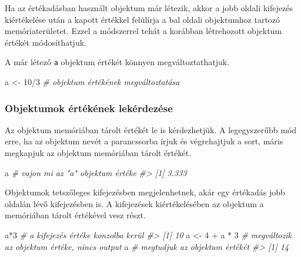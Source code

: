\documentclass[
]{book}
\newenvironment{Shaded}{\begin{snugshade}}{\end{snugshade}}
\newcommand{\CommentTok}[1]{\textcolor[rgb]{0.56,0.35,0.01}{\textit{#1}}}
\newcommand{\DecValTok}[1]{\textcolor[rgb]{0.00,0.00,0.81}{#1}}
\newcommand{\NormalTok}[1]{#1}
\newcommand{\OtherTok}[1]{\textcolor[rgb]{0.56,0.35,0.01}{#1}}
\newcommand{\SpecialCharTok}[1]{\textcolor[rgb]{0.00,0.00,0.00}{#1}}
\begin{document}
Ha az értékadásban használt objektum már létezik, akkor a jobb oldali kifejezés kiértékelése után a kapott értékkel felülírja a bal oldali objektumhoz tartozó memóriaterületet. Ezzel a módszerrel tehát a korábban létrehozott objektum értékét módosíthatjuk.

A már létező \texttt{a} objektum értékét könnyen megváltoztathatjuk.

\begin{Shaded}
\begin{Highlighting}[]
\NormalTok{a }\OtherTok{\textless{}{-}} \DecValTok{10}\SpecialCharTok{/}\DecValTok{3}   \CommentTok{\# objektum értékének megváltoztatása}
\end{Highlighting}
\end{Shaded}

\hypertarget{objektumok-uxe9rtuxe9kuxe9nek-lekuxe9rdezuxe9se}{%
\subsubsection{Objektumok értékének lekérdezése}\label{objektumok-uxe9rtuxe9kuxe9nek-lekuxe9rdezuxe9se}}

Az objektum memóriában tárolt értékét le is kérdezhetjük. A legegyszerűbb mód erre, ha az objektum nevét a parancssorba írjuk és végrehajtjuk a sort, máris megkapjuk az objektum memóriában tárolt értékét.

\begin{Shaded}
\begin{Highlighting}[]
\NormalTok{a     }\CommentTok{\# vajon mi az "a" objektum értéke}
\CommentTok{\#\textgreater{} [1] 3.333}
\end{Highlighting}
\end{Shaded}

Objektumok tetszőleges kifejezésben megjelenhetnek, akár egy értékadás jobb oldalán lévő kifejezésben is. A kifejezések kiértékelésében az objektum a memóriában tárolt értékével vesz részt.

\begin{Shaded}
\begin{Highlighting}[]
\NormalTok{a}\SpecialCharTok{*}\DecValTok{3}              \CommentTok{\# a kifejezés értéke konzolba kerül}
\CommentTok{\#\textgreater{} [1] 10}
\NormalTok{a }\OtherTok{\textless{}{-}} \DecValTok{4} \SpecialCharTok{+}\NormalTok{ a }\SpecialCharTok{*} \DecValTok{3}   \CommentTok{\# megváltozik az objektum értéke, nincs output}
\NormalTok{a                }\CommentTok{\# megtudjuk az objektum értékét}
\CommentTok{\#\textgreater{} [1] 14}
\end{Highlighting}
\end{Shaded}
\end{document}
